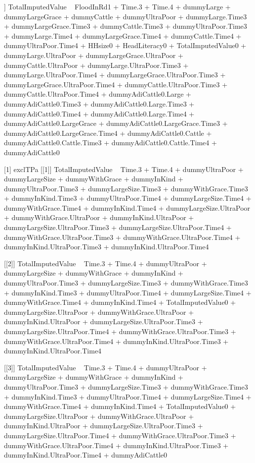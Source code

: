 \begin{Schunk}
\begin{Soutput}
[[6]]
TotalImputedValue ~ FloodInRd1 + Time.3 + Time.4 + dummyLarge + 
    dummyLargeGrace + dummyCattle + dummyUltraPoor + dummyLarge.Time3 + 
    dummyLargeGrace.Time3 + dummyCattle.Time3 + dummyUltraPoor.Time3 + 
    dummyLarge.Time4 + dummyLargeGrace.Time4 + dummyCattle.Time4 + 
    dummyUltraPoor.Time4 + HHsize0 + HeadLiteracy0 + TotalImputedValue0 + 
    dummyLarge.UltraPoor + dummyLargeGrace.UltraPoor + dummyCattle.UltraPoor + 
    dummyLarge.UltraPoor.Time3 + dummyLarge.UltraPoor.Time4 + 
    dummyLargeGrace.UltraPoor.Time3 + dummyLargeGrace.UltraPoor.Time4 + 
    dummyCattle.UltraPoor.Time3 + dummyCattle.UltraPoor.Time4 + 
    dummyAdiCattle0.Large + dummyAdiCattle0.Time3 + dummyAdiCattle0.Large.Time3 + 
    dummyAdiCattle0.Time4 + dummyAdiCattle0.Large.Time4 + dummyAdiCattle0.LargeGrace + 
    dummyAdiCattle0.LargeGrace.Time3 + dummyAdiCattle0.LargeGrace.Time4 + 
    dummyAdiCattle0.Cattle + dummyAdiCattle0.Cattle.Time3 + dummyAdiCattle0.Cattle.Time4 + 
    dummyAdiCattle0

[1] exclTPa
[[1]]
TotalImputedValue ~ Time.3 + Time.4 + dummyUltraPoor + dummyLargeSize + 
    dummyWithGrace + dummyInKind + dummyUltraPoor.Time3 + dummyLargeSize.Time3 + 
    dummyWithGrace.Time3 + dummyInKind.Time3 + dummyUltraPoor.Time4 + 
    dummyLargeSize.Time4 + dummyWithGrace.Time4 + dummyInKind.Time4 + 
    dummyLargeSize.UltraPoor + dummyWithGrace.UltraPoor + dummyInKind.UltraPoor + 
    dummyLargeSize.UltraPoor.Time3 + dummyLargeSize.UltraPoor.Time4 + 
    dummyWithGrace.UltraPoor.Time3 + dummyWithGrace.UltraPoor.Time4 + 
    dummyInKind.UltraPoor.Time3 + dummyInKind.UltraPoor.Time4

[[2]]
TotalImputedValue ~ Time.3 + Time.4 + dummyUltraPoor + dummyLargeSize + 
    dummyWithGrace + dummyInKind + dummyUltraPoor.Time3 + dummyLargeSize.Time3 + 
    dummyWithGrace.Time3 + dummyInKind.Time3 + dummyUltraPoor.Time4 + 
    dummyLargeSize.Time4 + dummyWithGrace.Time4 + dummyInKind.Time4 + 
    TotalImputedValue0 + dummyLargeSize.UltraPoor + dummyWithGrace.UltraPoor + 
    dummyInKind.UltraPoor + dummyLargeSize.UltraPoor.Time3 + 
    dummyLargeSize.UltraPoor.Time4 + dummyWithGrace.UltraPoor.Time3 + 
    dummyWithGrace.UltraPoor.Time4 + dummyInKind.UltraPoor.Time3 + 
    dummyInKind.UltraPoor.Time4

[[3]]
TotalImputedValue ~ Time.3 + Time.4 + dummyUltraPoor + dummyLargeSize + 
    dummyWithGrace + dummyInKind + dummyUltraPoor.Time3 + dummyLargeSize.Time3 + 
    dummyWithGrace.Time3 + dummyInKind.Time3 + dummyUltraPoor.Time4 + 
    dummyLargeSize.Time4 + dummyWithGrace.Time4 + dummyInKind.Time4 + 
    TotalImputedValue0 + dummyLargeSize.UltraPoor + dummyWithGrace.UltraPoor + 
    dummyInKind.UltraPoor + dummyLargeSize.UltraPoor.Time3 + 
    dummyLargeSize.UltraPoor.Time4 + dummyWithGrace.UltraPoor.Time3 + 
    dummyWithGrace.UltraPoor.Time4 + dummyInKind.UltraPoor.Time3 + 
    dummyInKind.UltraPoor.Time4 + dummyAdiCattle0


\end{Soutput}
\end{Schunk}
